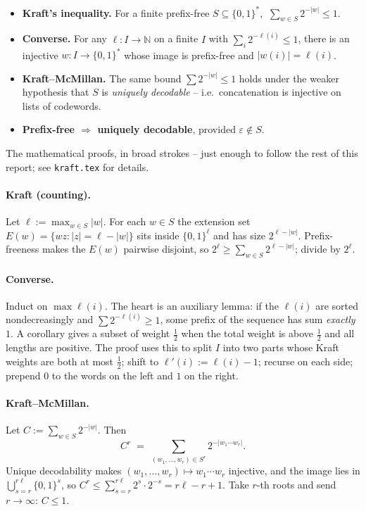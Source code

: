 \documentclass[11pt]{article}
\begin{document}
\begin{itemize}[leftmargin=1.5em,itemsep=1pt]
  \item \textbf{Kraft's inequality.} For a finite prefix-free $S \subseteq
    \{0,1\}^*$, $\ \sum_{w \in S} 2^{-|w|} \le 1$.
  \item \textbf{Converse.} For any $\ell\colon I \to \mathbb{N}$ on a finite
    $I$ with $\sum_i 2^{-\ell(i)} \le 1$, there is an injective
    $w\colon I \to \{0,1\}^*$ whose image is prefix-free and
    $|w(i)| = \ell(i)$.
  \item \textbf{Kraft--McMillan.} The same bound $\sum 2^{-|w|} \le 1$
    holds under the weaker hypothesis that $S$ is \emph{uniquely decodable}
    -- i.e.\ concatenation is injective on lists of codewords.
  \item \textbf{Prefix-free $\Rightarrow$ uniquely decodable}, provided
    $\varepsilon \notin S$.
\end{itemize}

\noindent
The mathematical proofs, in broad strokes -- just enough to follow the rest
of this report; see \texttt{kraft.tex} for details.

\paragraph{Kraft (counting).} Let $\ell := \max_{w \in S} |w|$. For each
$w \in S$ the extension set $E(w) = \{ wz : |z| = \ell - |w| \}$ sits inside
$\{0,1\}^\ell$ and has size $2^{\ell - |w|}$. Prefix-freeness makes the
$E(w)$ pairwise disjoint, so $2^\ell \ge \sum_{w \in S} 2^{\ell - |w|}$;
divide by $2^\ell$.

\paragraph{Converse.} Induct on $\max \ell(i)$. The heart is an auxiliary
lemma: if the $\ell(i)$ are sorted nondecreasingly and
$\sum 2^{-\ell(i)} \ge 1$, some prefix of the sequence has sum
\emph{exactly}~$1$. A corollary gives a subset of weight
$\tfrac{1}{2}$ when the total weight is above $\tfrac{1}{2}$ and all
lengths are positive. The proof uses this to split $I$ into two parts
whose Kraft weights are both at most $\tfrac{1}{2}$; shift to
$\ell'(i) := \ell(i) - 1$; recurse on each side; prepend $0$ to the words
on the left and $1$ on the right.

\paragraph{Kraft--McMillan.} Let $C := \sum_{w \in S} 2^{-|w|}$. Then
\[
  C^r \;=\; \sum_{(w_1,\dots,w_r) \in S^r} 2^{-|w_1 \cdots w_r|}.
\]
Unique decodability makes $(w_1,\dots,w_r) \mapsto w_1 \cdots w_r$
injective, and the image lies in $\bigcup_{s=r}^{r\ell} \{0,1\}^s$, so
$C^r \le \sum_{s=r}^{r\ell} 2^s \cdot 2^{-s} = r\ell - r + 1$.
Take $r$-th roots and send $r \to \infty$: $C \le 1$.
\end{document}
